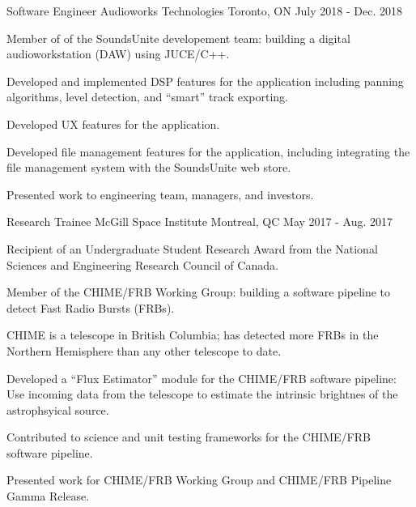 \begin{cventries}
    \cventry
    {Software Engineer} %
    {Audioworks Technologies} %
    {Toronto, ON} %
    {July 2018 - Dec. 2018} %
    {
      \begin{cvitems} %
        \item {Member of of the SoundsUnite developement team: building a digital audioworkstation (DAW) using JUCE/C++.}
        \item {Developed and implemented DSP features for the application including panning algorithms, level detection, and ``smart'' track exporting.}
        \item {Developed UX features for the application.}
        \item {Developed file management features for the application, including integrating the file management system with the SoundsUnite web store.}
        \item {Presented work to engineering team, managers, and investors.}
      \end{cvitems}
    }

  \cventry
    {Research Trainee} %
    {McGill Space Institute} %
    {Montreal, QC} %
    {May 2017 - Aug. 2017} %
    {
      \begin{cvitems} %
        \item {Recipient of an Undergraduate Student Research Award from the National Sciences and Engineering Research Council of Canada.}
        \item {Member of the CHIME/FRB Working Group: building a software pipeline to detect Fast Radio Bursts (FRBs).}
        \item {CHIME is a telescope in British Columbia; has detected more FRBs in the Northern Hemisphere than any other telescope to date.}
        \item {Developed a ``Flux Estimator'' module for the CHIME/FRB software pipeline: Use incoming data from the telescope to estimate the intrinsic brightnes of the astrophsyical source.}
        \item {Contributed to science and unit testing frameworks for the CHIME/FRB software pipeline.}
        \item {Presented work for CHIME/FRB Working Group and CHIME/FRB Pipeline Gamma Release.}
      \end{cvitems}
    }


\end{cventries}
